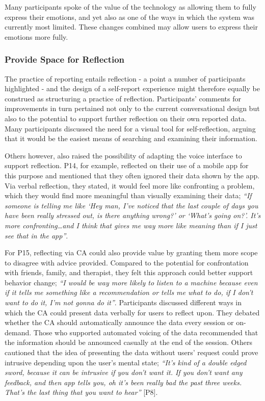             \vspace{0.25cm}    
            Many participants spoke of the value of the technology as allowing them to fully express their emotions, and yet also as one of the ways in which the system was currently most limited. These changes combined may allow users to express their emotions more fully.

        \subsubsection{Provide Space for Reflection}
        
            The practice of reporting entails reflection - a point a number of participants highlighted - and the design of a self-report experience might therefore equally be construed as structuring a practice of reflection. Participants' comments for improvements in turn pertained not only to the current conversational design but also to the potential to support further reflection on their own reported data. Many participants discussed the need for a visual tool for self-reflection, arguing that it would be the easiest means of searching and examining their information.
                   
            Others however, also raised the possibility of adapting the voice interface to support reflection. P14, for example, reflected on their use of a mobile app for this purpose and mentioned that they often ignored their data shown by the app. Via verbal reflection, they stated, it would feel more like confronting a problem, which they would find more meaningful than visually examining their data; \textit{``If someone is telling me like `Hey man, I've noticed that the last couple of days you have been really stressed out, is there anything wrong?' or `What's going on?'. It's more confronting\ldots and I think that gives me way more like meaning than if I just see that in the app''}.
            
            For P15, reflecting via \ac{CA} could also provide value by granting them more scope to disagree with advice provided. Compared to the potential for confrontation with friends, family, and therapist, they felt this approach could better support behavior change; \textit{``I would be way more likely to listen to a machine because even if it tells me something like a recommendation or tells me what to do, if I don't want to do it, I'm not gonna do it''}. Participants discussed different ways in which the \ac{CA} could present data verbally for users to reflect upon. They debated whether the \ac{CA} should automatically announce the data every session or on-demand. Those who supported automated voicing of the data recommended that the information should be announced casually at the end of the session. Others cautioned that the idea of presenting the data without users' request could prove intrusive depending upon the user's mental state; \textit{``It's kind of a double edged sword, because it can be intrusive if you don't want it. If you don't want any feedback, and then \acl{app} tells you, oh it's been really bad the past three weeks. That's the last thing that you want to hear''} [P8].
            
